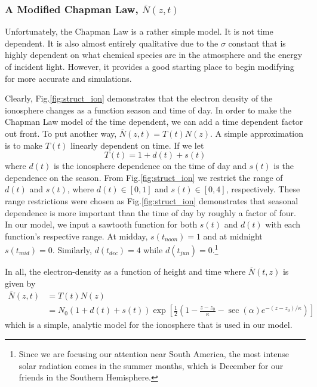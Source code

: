 \documentclass[11pt]{article}
\numberwithin{equation}{section}
\begin{document}
    
    \subsubsection{A Modified Chapman Law, $\overline N(z,t)$} %
    \label{ssub:modified_chapman_law}
    Unfortunately, the Chapman Law is a rather simple model. It is not time dependent. It is also almost entirely qualitative due to the $\sigma$ constant that is highly dependent on what chemical species are in the atmosphere and the energy of incident light. However, it provides a good starting place to begin modifying for more accurate and simulations.

    Clearly, Fig.\ref{fig:struct_ion} demonstrates that the electron density of the ionosphere changes as a function season and time of day. In order to make the Chapman Law model of the time dependent, we can add a time dependent factor out front. To put another way, $\overline N(z,t) = T(t) N(z)$. A simple approximation is to make $T(t)$ linearly dependent on time. If we let
    \begin{equation}
        T(t) = 1 + d(t) + s(t)
        \label{eq:time_dep}
    \end{equation}
    where $d(t)$ is the ionosphere dependence on the time of day and $s(t)$ is the dependence on the season. From Fig.\ref{fig:struct_ion} we restrict the range of $d(t)$ and $s(t)$, where $d(t) \in [0,1]$ and $s(t) \in [0,4]$, respectively. These range restrictions were chosen as Fig.\ref{fig:struct_ion} demonstrates that seasonal dependence is more important than the time of day by roughly a factor of four. In our model, we input a sawtooth function for both $s(t)$ and $d(t)$ with each function's respective range. At midday, $s(t_{noon}) = 1$ and at midnight $s(t_{mid}) = 0$. Similarly, $d(t_{dec}) = 4$ while $d(t_{jun}) = 0$.\footnote{Since we are focusing our attention near South America, the most intense solar radiation comes in the summer months, which is December for our friends in the Southern Hemisphere.}

    In all, the electron-density as a function of height and time where $\overline N(t,z)$ is given by 
    \begin{align}
        \overline N(z,t) &= T(t)N(z) \nonumber \\
        &= N_0(1 + d(t) + s(t))\exp\left[\frac12\left(1 - \frac{z-z_0}{\kappa} - \sec(\alpha) e^{- (z - z_0)/\kappa}\right)\right]
        \label{eq:final_eden}
    \end{align}
    which is a simple, analytic model for the ionosphere that is used in our model.
\end{document}
